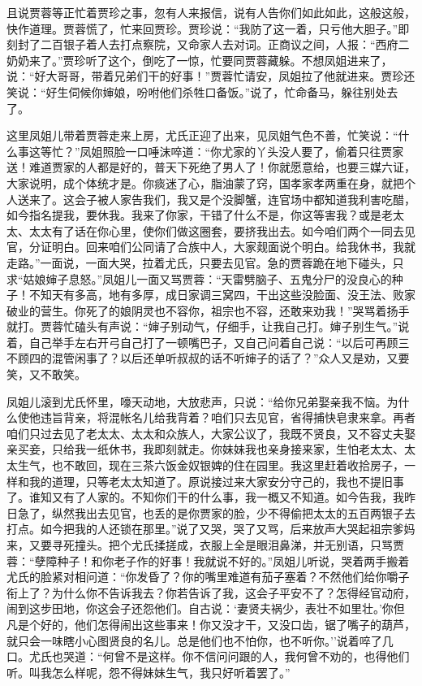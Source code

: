 且说贾蓉等正忙着贾珍之事，忽有人来报信，说有人告你们如此如此，这般这般，快作道理。贾蓉慌了，忙来回贾珍。贾珍说：``我防了这一着，只亏他大胆子。''即刻封了二百银子着人去打点察院，又命家人去对词。正商议之间，人报：``西府二奶奶来了。''贾珍听了这个，倒吃了一惊，忙要同贾蓉藏躲。不想凤姐进来了，说：``好大哥哥，带着兄弟们干的好事！''贾蓉忙请安，凤姐拉了他就进来。贾珍还笑说：``好生伺候你婶娘，吩咐他们杀牲口备饭。''说了，忙命备马，躲往别处去了。

这里凤姐儿带着贾蓉走来上房，尤氏正迎了出来，见凤姐气色不善，忙笑说：``什么事这等忙？''凤姐照脸一口唾沫啐道：``你尤家的丫头没人要了，偷着只往贾家送！难道贾家的人都是好的，普天下死绝了男人了！你就愿意给，也要三媒六证，大家说明，成个体统才是。你痰迷了心，脂油蒙了窍，国孝家孝两重在身，就把个人送来了。这会子被人家告我们，我又是个没脚蟹，连官场中都知道我利害吃醋，如今指名提我，要休我。我来了你家，干错了什么不是，你这等害我？或是老太太、太太有了话在你心里，使你们做这圈套，要挤我出去。如今咱们两个一同去见官，分证明白。回来咱们公同请了合族中人，大家觌面说个明白。给我休书，我就走路。''一面说，一面大哭，拉着尤氏，只要去见官。急的贾蓉跪在地下碰头，只求``姑娘婶子息怒。''凤姐儿一面又骂贾蓉：``天雷劈脑子、五鬼分尸的没良心的种子！不知天有多高，地有多厚，成日家调三窝四，干出这些没脸面、没王法、败家破业的营生。你死了的娘阴灵也不容你，祖宗也不容，还敢来劝我！''哭骂着扬手就打。贾蓉忙磕头有声说：``婶子别动气，仔细手，让我自己打。婶子别生气。''说着，自己举手左右开弓自己打了一顿嘴巴子，又自己问着自己说：``以后可再顾三不顾四的混管闲事了？以后还单听叔叔的话不听婶子的话了？''众人又是劝，又要笑，又不敢笑。

凤姐儿滚到尤氏怀里，嚎天动地，大放悲声，只说：``给你兄弟娶亲我不恼。为什么使他违旨背亲，将混帐名儿给我背着？咱们只去见官，省得捕快皂隶来拿。再者咱们只过去见了老太太、太太和众族人，大家公议了，我既不贤良，又不容丈夫娶亲买妾，只给我一纸休书，我即刻就走。你妹妹我也亲身接来家，生怕老太太、太太生气，也不敢回，现在三茶六饭金奴银婢的住在园里。我这里赶着收拾房子，一样和我的道理，只等老太太知道了。原说接过来大家安分守己的，我也不提旧事了。谁知又有了人家的。不知你们干的什么事，我一概又不知道。如今告我，我昨日急了，纵然我出去见官，也丢的是你贾家的脸，少不得偷把太太的五百两银子去打点。如今把我的人还锁在那里。''说了又哭，哭了又骂，后来放声大哭起祖宗爹妈来，又要寻死撞头。把个尤氏揉搓成，衣服上全是眼泪鼻涕，并无别语，只骂贾蓉：``孽障种子！和你老子作的好事！我就说不好的。''凤姐儿听说，哭着两手搬着尤氏的脸紧对相问道：``你发昏了？你的嘴里难道有茄子塞着？不然他们给你嚼子衔上了？为什么你不告诉我去？你若告诉了我，这会子平安不了？怎得经官动府，闹到这步田地，你这会子还怨他们。自古说：`妻贤夫祸少，表壮不如里壮。'你但凡是个好的，他们怎得闹出这些事来！你又没才干，又没口齿，锯了嘴子的葫芦，就只会一味瞎小心图贤良的名儿。总是他们也不怕你，也不听你。''说着啐了几口。尤氏也哭道：``何曾不是这样。你不信问问跟的人，我何曾不劝的，也得他们听。叫我怎么样呢，怨不得妹妹生气，我只好听着罢了。''

